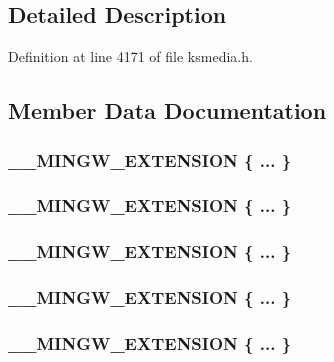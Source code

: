 \subsection{Detailed Description}


Definition at line 4171 of file ksmedia.\+h.



\subsection{Member Data Documentation}
\subsubsection[{\texorpdfstring{"@204}{@204}}]{\setlength{\rightskip}{0pt plus 5cm}\+\_\+\+\_\+\+M\+I\+N\+G\+W\+\_\+\+E\+X\+T\+E\+N\+S\+I\+ON \{ ... \} }\hypertarget{struct___d_d_p_i_x_e_l_f_o_r_m_a_t_ae804c384cffe4ac6bc66c23691875d3c}{}\label{struct___d_d_p_i_x_e_l_f_o_r_m_a_t_ae804c384cffe4ac6bc66c23691875d3c}
\subsubsection[{\texorpdfstring{"@206}{@206}}]{\setlength{\rightskip}{0pt plus 5cm}\+\_\+\+\_\+\+M\+I\+N\+G\+W\+\_\+\+E\+X\+T\+E\+N\+S\+I\+ON \{ ... \} }\hypertarget{struct___d_d_p_i_x_e_l_f_o_r_m_a_t_ae94efe10a7120dd38fd5300be1b3701c}{}\label{struct___d_d_p_i_x_e_l_f_o_r_m_a_t_ae94efe10a7120dd38fd5300be1b3701c}
\subsubsection[{\texorpdfstring{"@208}{@208}}]{\setlength{\rightskip}{0pt plus 5cm}\+\_\+\+\_\+\+M\+I\+N\+G\+W\+\_\+\+E\+X\+T\+E\+N\+S\+I\+ON \{ ... \} }\hypertarget{struct___d_d_p_i_x_e_l_f_o_r_m_a_t_ad0fc25972362ec628e85c82d6765249a}{}\label{struct___d_d_p_i_x_e_l_f_o_r_m_a_t_ad0fc25972362ec628e85c82d6765249a}
\subsubsection[{\texorpdfstring{"@210}{@210}}]{\setlength{\rightskip}{0pt plus 5cm}\+\_\+\+\_\+\+M\+I\+N\+G\+W\+\_\+\+E\+X\+T\+E\+N\+S\+I\+ON \{ ... \} }\hypertarget{struct___d_d_p_i_x_e_l_f_o_r_m_a_t_a939879c0a9d116129dce799f26b7d21f}{}\label{struct___d_d_p_i_x_e_l_f_o_r_m_a_t_a939879c0a9d116129dce799f26b7d21f}
\subsubsection[{\texorpdfstring{"@212}{@212}}]{\setlength{\rightskip}{0pt plus 5cm}\+\_\+\+\_\+\+M\+I\+N\+G\+W\+\_\+\+E\+X\+T\+E\+N\+S\+I\+ON \{ ... \} }\hypertarget{struct___d_d_p_i_x_e_l_f_o_r_m_a_t_a2f1ce76f8bc4dbda89e54aafc5b93e44}{}\label{struct___d_d_p_i_x_e_l_f_o_r_m_a_t_a2f1ce76f8bc4dbda89e54aafc5b93e44}
